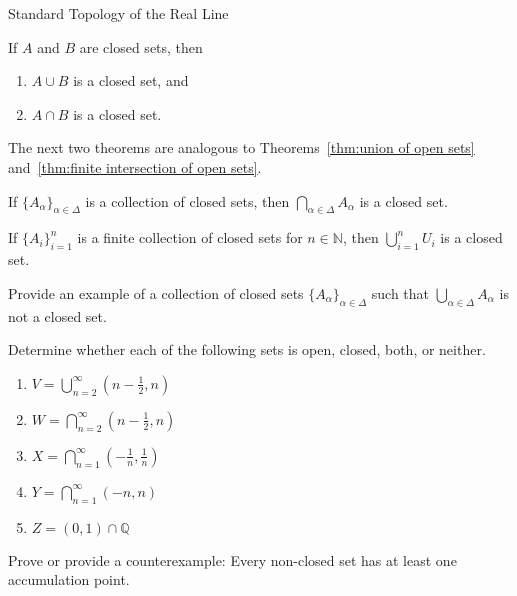 \begin{section}{Standard Topology of the Real Line}
\begin{theorem}\label{thm:finite union and intersection of closed sets}
If $A$ and $B$ are closed sets, then 
\begin{enumerate}[label=\textrm{(\alph*)}]
\item $A\cup B$ is a closed set, and
\item $A\cap B$ is a closed set.
\end{enumerate}
\end{theorem}

The next two theorems are analogous to Theorems~\ref{thm:union of open sets} and~\ref{thm:finite intersection of open sets}.

\begin{theorem}\label{thm:intersection of closed sets}
If $\{A_{\alpha}\}_{\alpha\in\Delta}$ is a collection of closed sets, then $\bigcap_{\alpha\in \Delta} A_{\alpha}$ is a closed set.
\end{theorem}

\begin{theorem}
If $\{A_{i}\}_{i=1}^n$ is a finite collection of closed sets for $n\in \mathbb{N}$, then $\bigcup_{i=1}^n U_{i}$ is a closed set.
\end{theorem}

\begin{problem}\label{prob:union of closed sets}
Provide an example of a collection of closed sets $\{A_{\alpha}\}_{\alpha\in\Delta}$ such that $\bigcup_{\alpha\in \Delta} A_{\alpha}$ is not a closed set.
\end{problem}

\begin{problem}
Determine whether each of the following sets is open, closed, both, or neither.
\begin{enumerate}[label=\textrm{(\alph*)}]
\item $\displaystyle V=\bigcup_{n=2}^{\infty} \left(n - \frac{1}{2},n\right)$
\item $\displaystyle W=\bigcap_{n=2}^{\infty} \left(n - \frac{1}{2},n\right)$
\item $\displaystyle X=\bigcap_{n=1}^{\infty} \left(-\frac{1}{n}, \frac{1}{n}\right)$
\item $\displaystyle Y=\bigcap_{n=1}^{\infty} \left(-n, n\right)$
\item $Z=(0,1)\cap \mathbb{Q}$
\end{enumerate}
\end{problem}

\begin{problem}
Prove or provide a counterexample: Every non-closed set has at least one accumulation point.
\end{problem}


\end{section}
